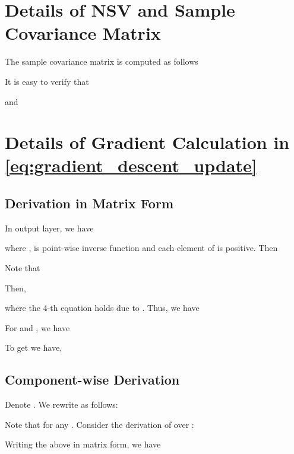 \documentclass{article}
\newcommand\iid{\textit{i.i.d.}}
\newcommand{\0}{{\boldsymbol{0}}}
\newcommand{\6}{{\partial}}
\newcommand{\8}{{\infty}}
\newcommand{\4}{{\nabla}}
\begin{document}
\section{Details of NSV and Sample Covariance Matrix}
\label{appendix:nsv_and_covariance_matrix}

The sample covariance matrix  is computed as follows 

It is easy to verify that

and


\fi
\section{Details of Gradient Calculation in \eqref{eq:gradient_descent_update}}
\label{appendix:details_of_nll_loss_explanation}
\subsection{Derivation in Matrix Form}
In output layer, we have

where ,  is point-wise inverse function and each element of  is positive. Then

Note that

Then,

where the  4-th equation holds due to . Thus, we have

For  and , we have

To get  we have, 


\subsection{Component-wise Derivation}
Denote . 
We rewrite  as follows:

Note that  for any . 
Consider the derivation of  over :

Writing the above in matrix form, we have

\iffalse
\section{Proof of The Worst Case of Aggregation Similarity Score}
\label{appendix:worst_case_proof}
\begin{proof}
Suppose we have  classes, and class  has  nodes. Suppose node  is in class ,  all elements in  are \iid with expectation  and variance . Let  and . Then

since

\end{proof}
\fi
\end{document}

